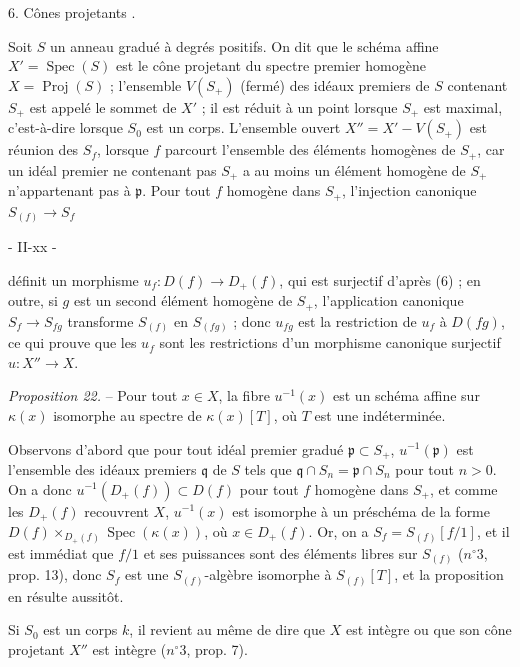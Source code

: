 6. Cônes projetants .

Soit $S$ un anneau gradué à degrés positifs. On dit que le schéma affine $X' = \operatorname{Spec}(S)$ est le cône projetant du spectre premier homogène $X = \operatorname{Proj}(S)$ ; l'ensemble $V(S_+)$ (fermé) des idéaux premiers de $S$ contenant $S_+$ est appelé le sommet de $X'$ ; il est réduit à un point lorsque $S_+$ est maximal, c'est-à-dire lorsque $S_0$ est un corps. L'ensemble ouvert $X'' = X' - V(S_+)$ est réunion des $S_f$, lorsque $f$ parcourt l'ensemble des éléments homogènes de $S_+$, car un idéal premier ne contenant pas $S_+$ a au moins un élément homogène de $S_+$ n'appartenant pas à $\mathfrak{p}$. Pour tout $f$ homogène dans $S_+$, l'injection canonique $S_{(f)} \to S_f$

\newpage


- II-xx -

définit un morphisme $u_f : D(f) \to D_+(f)$, qui est surjectif d'après (6) ; en outre, si $g$ est un second élément homogène de $S_+$, l'application canonique $S_f \to S_{fg}$ transforme $S_{(f)}$ en $S_{(fg)}$ ; donc $u_{fg}$ est la restriction de $u_f$ à $D(fg)$, ce qui prouve que les $u_f$ sont les restrictions d'un morphisme canonique surjectif $u : X'' \to X$.

\emph{Proposition 22.} -- Pour tout $x \in X$, la fibre $u^{-1}(x)$ est un schéma affine sur $\kappa(x)$ isomorphe au spectre de $\kappa(x)[T]$, où $T$ est une indéterminée.

Observons d'abord que pour tout idéal premier gradué $\mathfrak{p} \subset S_+$, $u^{-1}(\mathfrak{p})$ est l'ensemble des idéaux premiers $\mathfrak{q}$ de $S$ tels que $\mathfrak{q} \cap S_n = \mathfrak{p} \cap S_n$ pour tout $n > 0$. On a donc $u^{-1}(D_+(f)) \subset D(f)$ pour tout $f$ homogène dans $S_+$, et comme les $D_+(f)$ recouvrent $X$, $u^{-1}(x)$ est isomorphe à un préschéma de la forme $D(f) \times_{D_+(f)} \operatorname{Spec}(\kappa(x))$, où $x \in D_+(f)$. Or, on a $S_f = S_{(f)}[f/1]$, et il est immédiat que $f/1$ et ses puissances sont des éléments libres sur $S_{(f)}$ ($n^\circ 3$, prop. 13), donc $S_f$ est une $S_{(f)}$-algèbre isomorphe à $S_{(f)}[T]$, et la proposition en résulte aussitôt.

Si $S_0$ est un corps $k$, il revient au même de dire que $X$ est intègre ou que son cône projetant $X''$ est intègre ($n^\circ 3$, prop. 7).

\newpage


